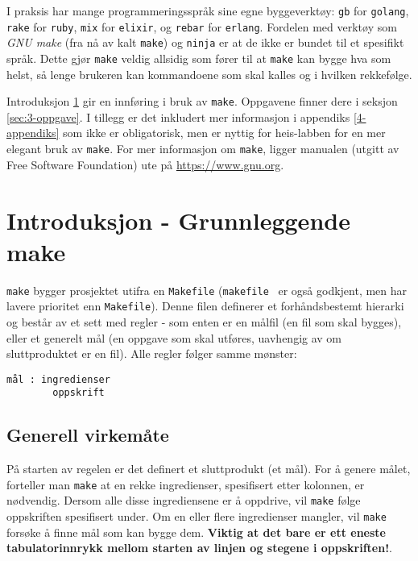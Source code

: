 \begin{alphasection}
 I praksis har mange programmeringsspråk sine egne byggeverktøy: \verb|gb| for \verb|golang|, \verb|rake| for \verb|ruby|, \verb|mix| for \verb|elixir|, og \verb|rebar| for \verb|erlang|. Fordelen med verktøy som \textit{GNU make} (fra nå av kalt \verb|make|) og \verb|ninja| er at de ikke er bundet til et spesifikt språk. Dette gjør \verb|make| veldig allsidig som fører til at \verb|make| kan bygge hva som helst, så lenge brukeren kan kommandoene som skal kalles og i hvilken rekkefølge.
 
 Introduksjon \ref{sec:2-innforing} gir en innføring i bruk av \verb|make|. Oppgavene finner dere i seksjon \ref{sec:3-oppgave}. I tillegg er det inkludert mer informasjon i appendiks \ref{4-appendiks} som ikke er obligatorisk, men er nyttig for heis-labben for en mer elegant bruk av \verb|make|. For mer informasjon om \verb|make|, ligger manualen (utgitt av Free Software Foundation) ute på \href{https://www.gnu.org/software/make/manual/make.html}{https://www.gnu.org}.
 

\section{Introduksjon - Grunnleggende make}\label{sec:2-innforing}

\verb|make| bygger prosjektet utifra en \verb|Makefile| (\verb|makefile| \ er også godkjent, men har lavere prioritet enn \verb|Makefile|). Denne filen definerer et forhåndsbestemt hierarki og består av et sett med regler - som enten er en målfil (en fil som skal bygges), eller et generelt mål (en oppgave som skal utføres, uavhengig av om sluttproduktet er en fil). Alle regler følger samme mønster:

\begin{lstlisting}
mål : ingredienser
        oppskrift
\end{lstlisting}

\subsection{Generell virkemåte}

På starten av regelen er det definert et sluttprodukt (et mål). For å genere målet, forteller man \verb|make| at en rekke ingredienser, spesifisert etter kolonnen, er nødvendig. Dersom alle disse ingrediensene er å oppdrive, vil \verb|make| følge oppskriften spesifisert under. Om en eller flere ingredienser mangler, vil \verb|make| forsøke å finne mål som kan bygge dem. \textcolor{RWTHrot100}{\textbf{Viktig at det bare er ett eneste tabulatorinnrykk mellom starten av linjen og stegene i oppskriften!}}.


\end{alphasection}
